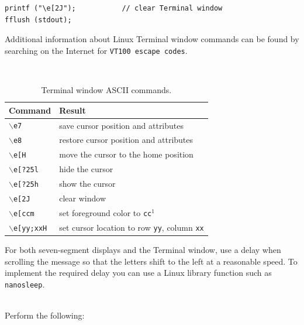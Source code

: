 \documentclass[epsfig,10pt,fullpage]{article}
\begin{document}
\begin{lstlisting}
printf ("\e[2J");			// clear Terminal window
fflush (stdout);
\end{lstlisting}

\noindent
Additional information about Linux Terminal window commands can be found by searching on 
the Internet for \texttt{VT100 escape codes}.
\begin{table}[h]
\caption{Terminal window ASCII commands.}
~\\
\centering
\label{tab:vt100}
\begin{tabular}{l|l}
		  {\bf Command} & {\bf Result} \\ \hline
		  \rule{0cm}{.375cm}\texttt{$\backslash$e7} & save cursor position and attributes\\
		  \texttt{$\backslash$e8} & restore cursor position and attributes\\
		  \texttt{$\backslash$e[H} & move the cursor to the home position\\
		  \texttt{$\backslash$e[?25l} & hide the cursor \\
		  \texttt{$\backslash$e[?25h} & show the cursor \\
		  \texttt{$\backslash$e[2J} & clear window \\
		  \texttt{$\backslash$e[ccm} & set foreground color to \texttt{cc}$^1$ \\
		  \texttt{$\backslash$e[yy;xxH} & set cursor location to row \texttt{yy}, column \texttt{xx}
		  
\end{tabular}
\end{table}

\noindent
For both seven-segment displays and the Terminal window, use a delay when scrolling the message 
so that the letters shift to the left at a reasonable speed. To implement the required delay you 
can use a Linux library function such as \texttt{nanosleep}. 

~\\
\noindent
Perform the following:
\end{document}
